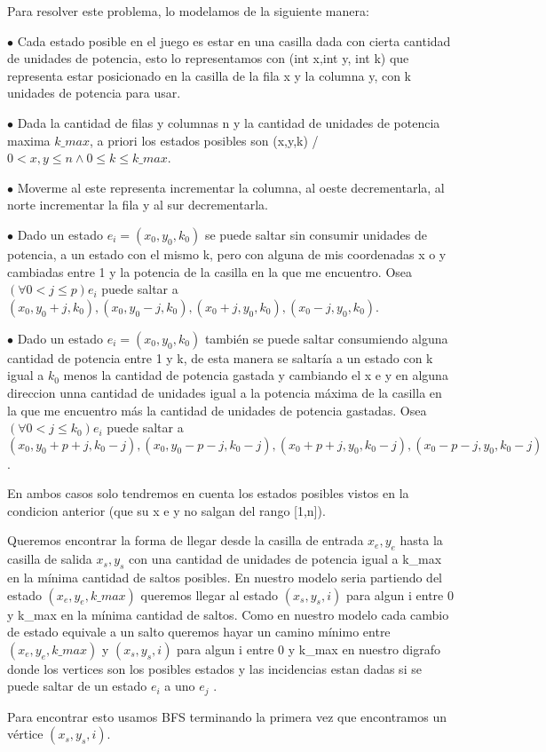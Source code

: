 Para resolver este problema, lo modelamos de la siguiente manera:

$\bullet$ Cada estado posible en el juego es estar en una casilla dada con cierta cantidad de unidades de potencia, esto lo representamos con (int x,int y, int k) que representa estar posicionado en la casilla de la fila x y la columna y, con k unidades de potencia para usar.

$\bullet$ Dada la cantidad de filas y columnas n y la cantidad de unidades de potencia maxima $k\_max$, a priori los estados posibles son (x,y,k) / $0 < x,y \leq n \wedge 0 \leq k \leq k\_max$. 

$\bullet$ Moverme al este representa incrementar la columna, al oeste decrementarla, al norte incrementar la fila y al sur decrementarla.

$\bullet$ Dado un estado $e_i = (x_0,y_0,k_0)$ se puede saltar sin consumir unidades de potencia, a un estado con el mismo k, pero con alguna de mis coordenadas x o y cambiadas entre 1 y la potencia de la casilla en la que me encuentro. Osea  $(\forall 0 < j \leq p ) e_i$ puede saltar a $(x_0,y_0+j,k_0), (x_0,y_0-j,k_0), (x_0+j,y_0,k_0), (x_0-j,y_0,k_0)$.

$\bullet$ Dado un estado $e_i = (x_0,y_0,k_0)$ también se puede saltar consumiendo alguna cantidad de potencia entre 1 y k, de esta manera se saltaría a un estado con k igual a $k_0$ menos la cantidad de potencia gastada y cambiando el x e y en alguna direccion unna cantidad de unidades igual a la potencia máxima de la casilla en la que me encuentro más la cantidad de unidades de potencia gastadas. Osea $(\forall 0 < j \leq k_0 ) e_i$ puede saltar a $(x_0,y_0+p+j,k_0-j), (x_0,y_0-p-j,k_0-j), (x_0+p+j,y_0,k_0-j), (x_0-p-j,y_0,k_0-j)$. 

En ambos casos solo tendremos en cuenta los estados posibles vistos en la condicion anterior (que su x e y no salgan del rango [1,n]).

Queremos encontrar la forma de llegar desde la casilla de entrada $x_e,y_e$ hasta la casilla de salida $x_s,y_s$ con una cantidad de unidades de potencia igual a k\_max en la mínima cantidad de saltos posibles. En nuestro modelo seria partiendo del estado $(x_e,y_e,k\_max)$ queremos llegar al estado $(x_s,y_s,i)$ para algun i entre 0 y k\_max en la mínima cantidad de saltos. Como en nuestro modelo cada cambio de estado equivale a un salto queremos hayar un camino mínimo entre $(x_e,y_e,k\_max)$ y $(x_s,y_s,i)$ para algun i entre 0 y k\_max en nuestro digrafo donde los vertices son los posibles estados y las incidencias estan dadas si se puede saltar de un estado $e_i$ a uno $e_j$ .

Para encontrar esto usamos BFS terminando la primera vez que encontramos un vértice $(x_s,y_s,i)$.



